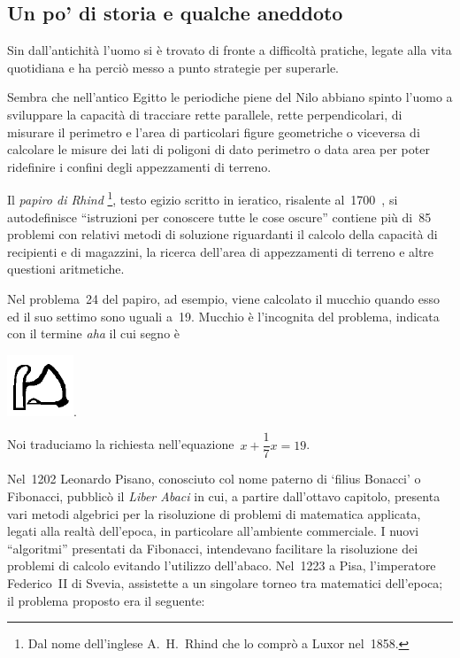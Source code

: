 \subsection{Un po' di storia e qualche aneddoto}
\label{subsec:equazioni_problemi_storia}

Sin dall'antichità l'uomo si è
trovato di fronte a difficoltà pratiche, legate alla vita quotidiana
e ha perciò messo a punto strategie per superarle.

Sembra che nell'antico Egitto le periodiche piene del
Nilo abbiano spinto l'uomo a sviluppare la capacità
di tracciare rette parallele, rette perpendicolari, di misurare il
perimetro e l'area di particolari figure geometriche o
viceversa di calcolare le misure dei lati di poligoni di dato perimetro
o data area per poter ridefinire i confini degli appezzamenti di
terreno.

Il \emph{papiro di Rhind}
\footnote{Dal nome dell'inglese A.~H.~Rhind che lo comprò a Luxor nel~1858.}, 
testo egizio scritto in
ieratico, risalente al~1700~\aC, si autodefinisce
``istruzioni per conoscere tutte le cose
oscure'' contiene più di~85 problemi con relativi
metodi di soluzione riguardanti il calcolo della capacità di
recipienti e di magazzini, la ricerca dell'area di
appezzamenti di terreno e altre questioni aritmetiche.

Nel problema~24 del papiro, ad esempio, viene calcolato il mucchio
quando esso ed il suo settimo sono uguali a~19. Mucchio è
l'incognita del problema, indicata con il termine
\emph{aha} il cui segno è
% 
\begin{inaccessibleblock}[Geroglifico]
 \includegraphics[scale=0.28]{img/giero.png}.
\end{inaccessibleblock}
                                                                  
Noi traduciamo la richiesta nell'equazione~$x+\dfrac{1}{7}x=19$.

Nel~1202 Leonardo Pisano, conosciuto col nome paterno di
`filius Bonacci' o Fibonacci, pubblicò il
\emph{Liber Abaci} in cui, a partire dall'ottavo
capitolo, presenta vari metodi algebrici per la risoluzione di problemi
di matematica applicata, legati alla realtà
dell'epoca, in particolare
all'ambiente commerciale. I nuovi
``algoritmi'' presentati da Fibonacci,
intendevano facilitare la risoluzione dei problemi di calcolo evitando
l'utilizzo dell'abaco. Nel~1223 a
Pisa, l'imperatore Federico~II di Svevia, assistette a
un singolare torneo tra matematici dell'epoca; il
problema proposto era il seguente:

